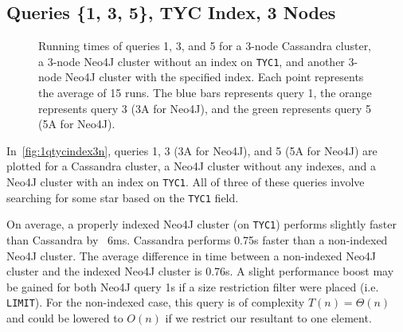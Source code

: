 \subsection{Queries \{1, 3, 5\}, TYC Index, 3 Nodes}\label{subsec:queries1,3,5,TycIndex,3Nodes}
\begin{figure}
    \caption{Running times of queries 1, 3, and 5 for a 3-node Cassandra cluster, a 3-node Neo4J cluster without an
    index on \texttt{TYC1}, and another 3-node Neo4J cluster with the specified index.
    Each point represents the average of 15 runs.
    The blue bars represents query 1, the orange represents query 3 (3A for Neo4J), and the green represents query 5
    (5A for Neo4J).}\label{fig:1qtycindex3n}
\end{figure}

In~\autoref{fig:1qtycindex3n}, queries 1, 3 (3A for Neo4J), and 5 (5A for Neo4J) are plotted for a Cassandra cluster,
a Neo4J cluster without any indexes, and a Neo4J cluster with an index on \texttt{TYC1}.
All of three of these queries involve searching for some star based on the \texttt{TYC1} field.

On average, a properly indexed Neo4J cluster (on \texttt{TYC1}) performs slightly faster than Cassandra by ~6ms.
Cassandra performs 0.75s faster than a non-indexed Neo4J cluster.
The average difference in time between a non-indexed Neo4J cluster and the indexed Neo4J cluster is 0.76s.
A slight performance boost may be gained for both Neo4J query 1s if a size restriction filter were placed (i.e.
\texttt{LIMIT}).
For the non-indexed case, this query is of complexity $T(n) = \Theta(n)$ and could be lowered to $O(n)$ if we
restrict our resultant to one element.

